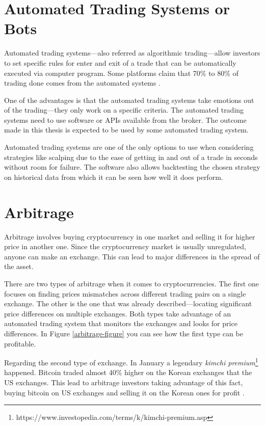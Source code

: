 \section{Automated Trading Systems or Bots}
\label{bots}
Automated trading systems---also referred as algorithmic trading---allow investors to set specific rules for enter and exit of a trade that can be automatically executed via computer program. Some platforms claim that 70\% to 80\% of trading done comes from the automated systems \cite{investopedia-bot-trading}.

One of the advantages is that the automated trading systems take emotions out of the trading---they only work on a specific criteria. The automated trading systems need to use software or APIs available from the broker. The outcome made in this thesis is expected to be used by some automated trading system.

Automated trading systems are one of the only options to use when considering strategies like scalping due to the ease of getting in and out of a trade in seconds without room for failure. The software also allows backtesting the chosen strategy on historical data from which it can be seen how well it does perform.

\section{Arbitrage}
Arbitrage involves buying cryptocurrency in one market and selling it for higher price in another one. Since the cryptocurrency market is usually unregulated, anyone can make an exchange. This can lead to major differences in the spread of the asset. 

There are two types of arbitrage when it comes to cryptocurrencies. The first one focuses on finding prices mismatches across different trading pairs on a single exchange. The other is the one that was already described---locating significant price differences on multiple exchanges. Both types take advantage of an automated trading system that monitors the exchanges and looks for price differences. In Figure \ref{arbitrage-figure} you can see how the first type can be profitable.

Regarding the second type of exchange. In January a legendary \emph{kimchi premium}\footnote{https://www.investopedia.com/terms/k/kimchi-premium.asp} happened. Bitcoin traded almost 40\% higher on the Korean exchanges that the US exchanges. This lead to arbitrage investors taking advantage of this fact, buying bitcoin on US exchanges and selling it on the Korean ones for profit \cite{hodlbot:day-trading-cryptocurrency}.

